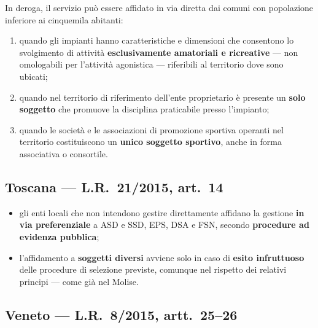 
In deroga, il servizio può essere affidato in via diretta dai comuni con popolazione inferiore ai
cinquemila abitanti:

\begin{enumerate}
  \item[a)] quando gli impianti hanno caratteristiche e dimensioni che consentono lo svolgimento di
    attività \textbf{esclusivamente amatoriali e ricreative} --- non omologabili per l'attività
    agonistica --- riferibili al territorio dove sono ubicati;
  \item[b)] quando nel territorio di riferimento dell'ente proprietario è presente un \textbf{solo
    soggetto} che promuove la disciplina praticabile presso l'impianto;
  \item[c)] quando le società e le associazioni di promozione sportiva operanti nel territorio
    costituiscono un \textbf{unico soggetto sportivo}, anche in forma associativa o consortile.
\end{enumerate}

\subsection{Toscana --- L.R.\ 21/2015, art.\ 14}

\begin{itemize}
  \item gli enti locali che non intendono gestire direttamente affidano la gestione \textbf{in via
    preferenziale} a ASD e SSD, EPS, DSA e FSN, secondo \textbf{procedure ad evidenza pubblica};
  \item l'affidamento a \textbf{soggetti diversi} avviene solo in caso di \textbf{esito
    infruttuoso} delle procedure di selezione previste, comunque nel rispetto dei relativi
    principi --- come già nel Molise.
\end{itemize}

\subsection{Veneto --- L.R.\ 8/2015, artt.\ 25--26}

